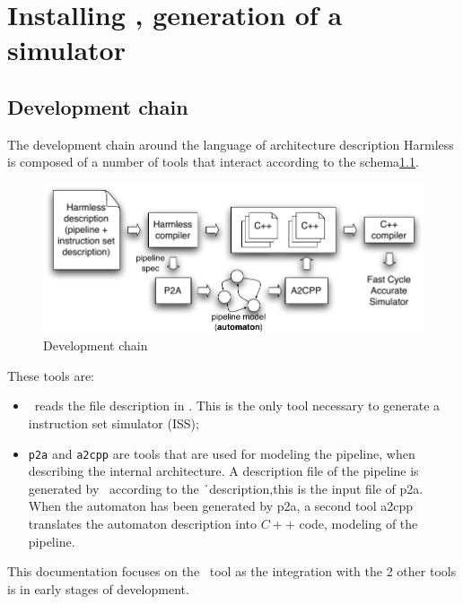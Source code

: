 
\chapter{Installing \harmless, generation of a simulator}
\section{Development chain}
The development chain around the language of architecture description Harmless is composed of a number of tools that interact according to the schema\ref{fig:devTool}.
\begin{figure}		%
  \begin{center}
    \includegraphics[width=0.8 \linewidth]{../common/images/devTools.pdf}
    \caption{Development chain}
    \label{fig:devTool}
  \end{center}
\end{figure}

These tools are:
\begin{itemize}
\item \gadl\ reads the file description in \harmless. This is the only tool necessary to generate a instruction set simulator (ISS);
\item  \texttt{p2a} and \texttt{a2cpp} are tools that are used for modeling the pipeline, when describing the internal architecture.  A description file of the pipeline is generated by \gadl\ according to the \h\ description,this is the input file of p2a. When the automaton has been generated by p2a, a second tool a2cpp translates the automaton description into $C++$ code, modeling of the pipeline.
\end{itemize}

This documentation focuses on the \gadl\ tool as the integration with the 2 other tools is in early stages of development.

